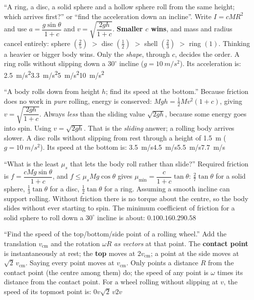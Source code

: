 {``A ring, a disc, a solid sphere and a hollow sphere roll from the same height; which arrives first?'' or ``find the acceleration down an incline''.}
{Write $I=c MR^2$ and use $a=\dfrac{g\sin\theta}{1+c}$ and
$v=\sqrt{\dfrac{2gh}{1+c}}$. \textbf{Smaller $c$ wins}, and mass and radius cancel entirely:
sphere $(\tfrac25)$ $>$ disc $(\tfrac12)$ $>$ shell $(\tfrac23)$ $>$ ring $(1)$.}
{Thinking a heavier or bigger body wins. Only the \emph{shape}, through $c$, decides the order.}
{A ring rolls without slipping down a $30^\circ$ incline ($g=\SI{10}{m/s^2}$). Its acceleration is:}
{\SI{2.5}{m/s^2}}{\SI{3.3}{m/s^2}}{\SI{5}{m/s^2}}{\SI{10}{m/s^2}}

{``A body rolls down from height $h$; find its speed at the bottom.''}
{Because friction does no work in \emph{pure} rolling, energy is conserved:
$Mgh=\tfrac12Mv^2(1+c)$, giving $v=\sqrt{\dfrac{2gh}{1+c}}$. Always \emph{less} than the sliding
value $\sqrt{2gh}$, because some energy goes into spin.}
{Using $v=\sqrt{2gh}$. That is the \emph{sliding} answer; a rolling body arrives slower.}
{A disc rolls without slipping from rest through a height of \SI{1.5}{m} ($g=\SI{10}{m/s^2}$). Its speed at the bottom is:}
{\SI{3.5}{m/s}}{\SI{4.5}{m/s}}{\SI{5.5}{m/s}}{\SI{7.7}{m/s}}

{``What is the least $\mu_s$ that lets the body roll rather than slide?''}
{Required friction is $f=\dfrac{c Mg\sin\theta}{1+c}$, and $f\le\mu_s Mg\cos\theta$ gives
$\boxed{\mu_{\min}=\dfrac{c}{1+c}\tan\theta}$: $\tfrac27\tan\theta$ for a solid sphere,
$\tfrac13\tan\theta$ for a disc, $\tfrac12\tan\theta$ for a ring.}
{Assuming a smooth incline can support rolling. Without friction there is no torque about the centre, so
the body slides without ever starting to spin.}
{The minimum coefficient of friction for a solid sphere to roll down a $30^\circ$ incline is about:}
{$0.10$}{$0.16$}{$0.29$}{$0.58$}

{``Find the speed of the top/bottom/side point of a rolling wheel.''}
{Add the translation $v_{\text{cm}}$ and the rotation $\omega R$ \emph{as vectors} at that point. The
\textbf{contact point} is instantaneously at rest; the \textbf{top} moves at $2v_{\text{cm}}$; a point at the
side moves at $\sqrt2\,v_{\text{cm}}$.}
{Saying every point moves at $v_{\text{cm}}$. Only points a distance $R$ from the contact point (the centre
among them) do; the speed of any point is $\omega$ times its distance from the contact point.}
{For a wheel rolling without slipping at $v$, the speed of its topmost point is:}
{$0$}{$v$}{$\sqrt2\,v$}{$2v$}

